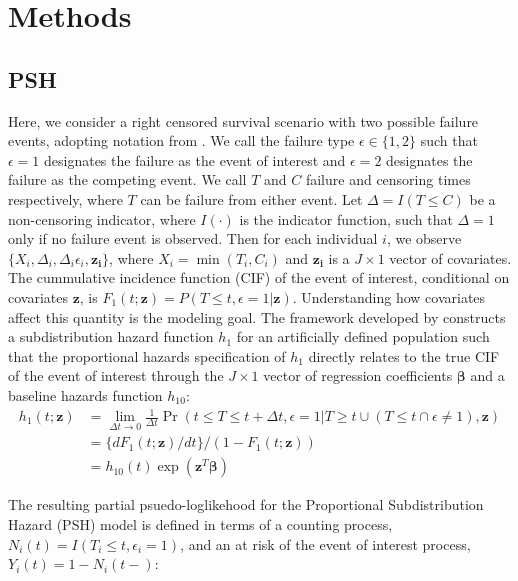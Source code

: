 \documentclass[11pt,a4paper]{article}
\let\cite\parencite
\begin{document}
\newpage
\section{Methods}
\subsection{PSH}
Here, we consider a right censored survival scenario with two possible failure events, adopting notation from \cite{FineGray1999}. We call the failure type $\epsilon \in \{1,2\}$ such that $\epsilon = 1$ designates the failure as the event of interest and $\epsilon = 2$ designates the failure as the competing event. We call $T$ and $C$ failure and censoring times respectively, where $T$ can be failure from either event. Let $\Delta = I(T \leq C)$ be a non-censoring indicator, where $I(\cdot)$ is the indicator function, such that $\Delta = 1$ only if no failure event is observed. Then for each individual $i$, we observe $\{X_i, \Delta_i, \Delta_i \epsilon_i, \mathbf{z_i}\}$, where $X_i = \min(T_i, C_i)$ and $\mathbf{z_i}$ is a $J \times 1$ vector of covariates.  \\

 The cummulative incidence function (CIF) of the event of interest, conditional on covariates $\mathbf{z}$, is $F_1(t;\mathbf{z}) = P(T \leq t, \epsilon = 1 | \mathbf{z})$. Understanding how covariates affect this quantity is the modeling goal. The framework developed by \cite{FineGray1999} constructs a subdistribution hazard function $h_1$ for an artificially defined population such that the proportional hazards specification of $h_1$ directly relates to the true CIF of the event of interest through the $J \times 1$ vector of regression coefficients $\boldsymbol{\beta}$ and a baseline hazards function $h_{10}$:
 \begin{align*}
     h_1(t ; \mathbf{z}) & = \lim_{\Delta t \rightarrow 0} \frac{1}{\Delta t} \Pr(t \leq T \leq t + \Delta t, \epsilon = 1 | T \geq t \cup (T \leq t \cap \epsilon \ne 1), \mathbf{z})\\
     & = \{dF_1(t;\mathbf{z})/dt\}/(1-F_1(t;\mathbf{z}))\\
     & = h_{10}(t) \exp (\mathbf{z}^T\boldsymbol{\beta})
 \end{align*}

The resulting partial psuedo-loglikehood for the  Proportional Subdistribution Hazard (PSH) model is defined in terms of a counting process, $N_i(t) = I(T_i \le t, \epsilon_i = 1)$, and an at risk of the event of interest process, $Y_i(t) = 1 - N_i(t-)$:
\end{document}
